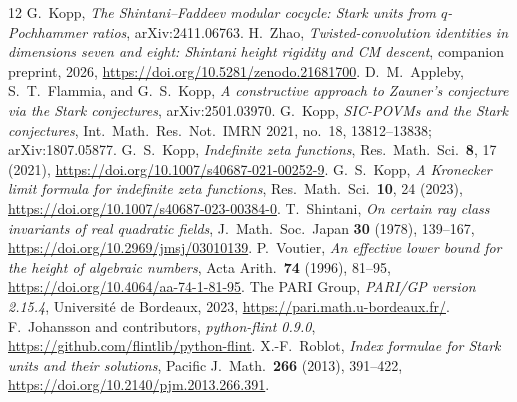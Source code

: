 \documentclass[11pt]{article}
\begin{document}
\begin{thebibliography}{12}
G.~Kopp, \emph{The Shintani--Faddeev modular cocycle: Stark units from
$q$-Pochhammer ratios}, arXiv:2411.06763.
H.~Zhao, \emph{Twisted-convolution identities in dimensions seven and
eight: Shintani height rigidity and CM descent}, companion preprint,
2026, \url{https://doi.org/10.5281/zenodo.21681700}.
D.~M.~Appleby, S.~T.~Flammia, and G.~S.~Kopp,
\emph{A constructive approach to Zauner's conjecture via the Stark
conjectures}, arXiv:2501.03970.
G.~Kopp, \emph{SIC-POVMs and the Stark conjectures},
Int.\ Math.\ Res.\ Not.\ IMRN 2021, no.~18, 13812--13838;
arXiv:1807.05877.
G.~S.~Kopp, \emph{Indefinite zeta functions},
Res.\ Math.\ Sci.\ \textbf{8}, 17 (2021),
\url{https://doi.org/10.1007/s40687-021-00252-9}.
G.~S.~Kopp, \emph{A Kronecker limit formula for indefinite zeta
functions}, Res.\ Math.\ Sci.\ \textbf{10}, 24 (2023),
\url{https://doi.org/10.1007/s40687-023-00384-0}.
T.~Shintani, \emph{On certain ray class invariants of real quadratic
fields}, J.\ Math.\ Soc.\ Japan \textbf{30} (1978), 139--167,
\url{https://doi.org/10.2969/jmsj/03010139}.
P.~Voutier, \emph{An effective lower bound for the height of algebraic
numbers}, Acta Arith.\ \textbf{74} (1996), 81--95,
\url{https://doi.org/10.4064/aa-74-1-81-95}.
The PARI Group, \emph{PARI/GP version 2.15.4},
Université de Bordeaux, 2023,
\url{https://pari.math.u-bordeaux.fr/}.
F.~Johansson and contributors, \emph{python-flint 0.9.0},
\url{https://github.com/flintlib/python-flint}.
X.-F.~Roblot, \emph{Index formulae for Stark units and their
solutions}, Pacific J.\ Math.\ \textbf{266} (2013), 391--422,
\url{https://doi.org/10.2140/pjm.2013.266.391}.
\end{thebibliography}
\end{document}
